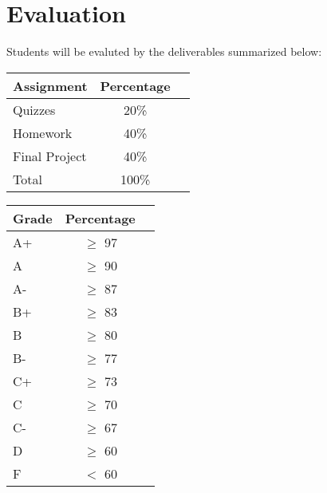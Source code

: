 \documentclass{article}
\begin{document}
\section{Evaluation}
Students will be evaluted by the deliverables summarized below:\\
\begin{center}
	\begin{tabular}{lcr}
		\hline
		Assignment & Percentage \\
		\hline
		Quizzes & 20\%\\
		Homework & 40\%\\
		Final Project & 40\%\\
		\hline
		Total & 100\%\\   
		\hline     
	\end{tabular}
\end{center}

\begin{center}
	\begin{tabular}{lcr}
		\hline
		Grade & Percentage\\
		\hline
		A+ & $\geq$ 97\\
		A & $\geq$ 90\\
		A- & $\geq$ 87\\
		B+ & $\geq$ 83\\
		B & $\geq$ 80\\
		B- & $\geq$ 77\\
		C+ & $\geq$ 73\\
		C & $\geq$ 70\\
		C- & $\geq$ 67\\
		D & $\geq$ 60\\
		F & $<$ 60\\
		\hline 
	\end{tabular}
\end{center}
\end{document}

